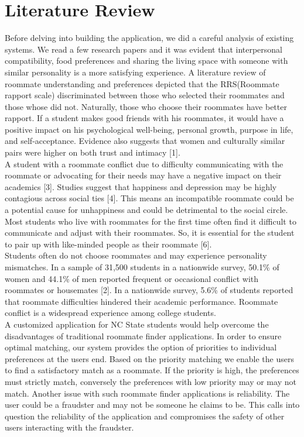 \documentclass{sig-alternate-05-2015}
\begin{document}
\section{Literature Review}
Before delving into building the application, we did a careful analysis of existing systems. We read a few research papers and it was evident that interpersonal compatibility, food preferences and sharing the living space with someone with similar personality is a more satisfying experience. A literature review of roommate understanding and preferences depicted that the RRS(Roommate rapport scale) discriminated between those who selected their roommates and those whose did not. Naturally, those who choose their roommates have better rapport. If a student makes good friends with his roommates, it would have a positive impact on his psychological well-being, personal growth, purpose in life, and self-acceptance. Evidence also suggests that women and culturally similar pairs were higher on both trust and intimacy [1]. \\


A student with a roommate conflict due to difficulty communicating with the roommate or advocating for their needs may have a negative impact on their academics [3]. Studies suggest that happiness and depression may be highly contagious across social ties [4]. This means an incompatible roommate could be a potential cause for unhappiness and could be detrimental to the social circle. Most students who live with roommates for the first time often find it difficult to communicate and adjust with their roommates. So, it is essential for the student to pair up with like-minded people as their roommate [6].\\

Students often do not choose roommates and may experience personality mismatches. In a sample of 31,500 students in a nationwide survey, 50.1\% of women and 44.1\% of men reported frequent or occasional conflict with roommates or housemates [2]. In a nationwide survey, 5.6\% of students reported that roommate difficulties hindered their academic performance. Roommate conflict is a widespread experience among college students.\\

A customized application for NC State students would help overcome the disadvantages of traditional roommate finder applications. In order to ensure optimal matching, our system provides the option of priorities to individual preferences at the users end. Based on the priority matching we enable the users to find a satisfactory match as a roommate. If the priority is high, the preferences must strictly match, conversely the preferences with low priority may or may not match. Another issue with such roommate finder applications is reliability. The user could be a fraudster and may not be someone he claims to be. This calls into question the reliability of the application and compromises the safety of other users interacting with the fraudster. 
\\
\end{document}
